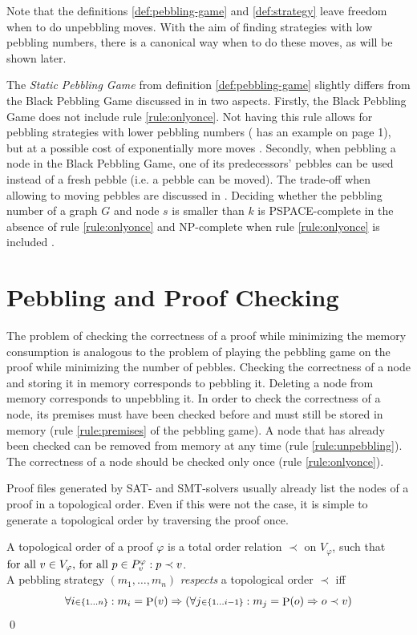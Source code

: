\documentclass{llncs}
\DeclareMathOperator{\pebble}{P}
\newcommand{\indexIn}[3]{\ensuremath{#1 \scriptstyle \in \{#2\ldots #3\} \displaystyle}}
\newcommand{\Vertices}[1]{V_{#1}}
\newcommand{\Premises}[2]{P_{#1}^{#2}}
\begin{document}
Note that the definitions \ref{def:pebbling-game} and \ref{def:strategy} leave freedom when to do unpebbling moves.
With the aim of finding strategies with low pebbling numbers, there is a canonical way when to do these moves, as will be shown later.

\noindent
The \emph{Static Pebbling Game} from definition \ref{def:pebbling-game} slightly differs from the Black Pebbling Game discussed in \cite{hertel2007black,pippenger1982advances} in two aspects. Firstly, the Black Pebbling Game does not include rule \ref{rule:onlyonce}. Not having this rule allows for pebbling strategies with lower pebbling numbers (\cite{sethi1975complete} has an example on page 1), but at a possible cost of exponentially more moves \cite{van1979move}. Secondly, when pebbling a node in the Black Pebbling Game, one of its predecessors' pebbles can be used instead of a fresh pebble (i.e. a pebble can be moved). The trade-off when allowing to moving pebbles are discussed in \cite{van1979move}. Deciding whether the pebbling number of a graph $G$ and node $s$ is smaller than $k$ is PSPACE-complete in the absence of rule \ref{rule:onlyonce} \cite{gilbert1980pebbling} and NP-complete when rule \ref{rule:onlyonce} is included \cite{sethi1975complete}.

\section{Pebbling and Proof Checking}
\label{sec:pebblingchecking}

The problem of checking the correctness of a proof while minimizing the memory consumption is analogous to the problem of playing the pebbling game on the proof while minimizing the number of pebbles. Checking the correctness of a node and storing it in memory corresponds to pebbling it. Deleting a node from memory corresponds to unpebbling it. In order to check the correctness of a node, its premises must have been checked before and must still be stored in memory (rule \ref{rule:premises} of the pebbling game). A node that has already been checked can be removed from memory at any time (rule \ref{rule:unpebbling}). The correctness of a node should be checked only once (rule \ref{rule:onlyonce}).

Proof files generated by SAT- and SMT-solvers usually already list the nodes of a proof in a topological order. Even if this were not the case, it is simple to generate a topological order by traversing the proof once.

\begin{definition}
\label{def:topological-order}
A topological order of a proof $\varphi$ is a total order relation $\prec$ on $\Vertices{\varphi}$, such that 
$
\text{for all } \n \in \Vertices{\varphi} \text{, for all } p \in \Premises{\n}{\varphi}:
p \prec v
$.\\
A pebbling strategy $(m_1,\ldots,m_n)$ \emph{respects} a topological order $\prec$ iff
$$
\forall \indexIn{i}{1}{n}: m_i = \pebble(\n) \Rightarrow \left( \forall \indexIn{j}{1}{i-1}: m_j = \pebble(o) \Rightarrow o \prec \n \right)
$$
\qed
\end{definition}
\end{document}
